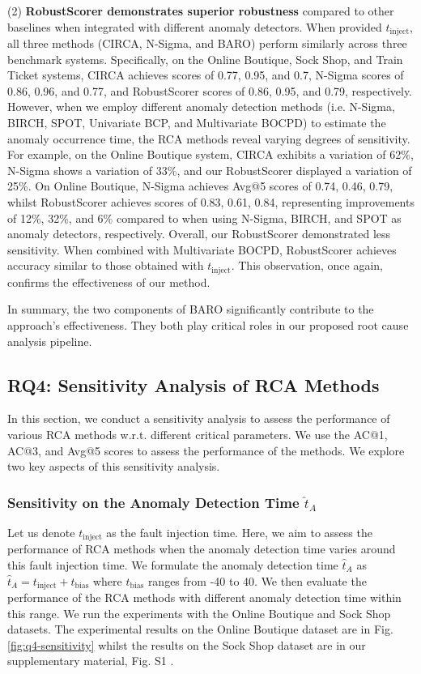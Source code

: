 (2) \textbf{RobustScorer demonstrates superior robustness} compared to other baselines when integrated with different anomaly detectors. When provided $t_{\text{inject}}$, all three methods (CIRCA, N-Sigma, and BARO) perform similarly across three benchmark systems. Specifically, on the Online Boutique, Sock Shop, and Train Ticket systems, CIRCA achieves scores of 0.77, 0.95, and 0.7, N-Sigma scores of 0.86, 0.96, and 0.77, and RobustScorer scores of 0.86, 0.95, and 0.79, respectively. However, when we employ different anomaly detection methods (i.e. N-Sigma, BIRCH, SPOT, Univariate BCP, and Multivariate BOCPD) to estimate the anomaly occurrence time, the RCA methods reveal varying degrees of sensitivity. For example, on the Online Boutique system, CIRCA exhibits a variation of 62\%, N-Sigma shows a variation of 33\%, and our RobustScorer displayed a variation of 25\%. 
On Online Boutique, N-Sigma achieves Avg@5 scores of 0.74, 0.46, 0.79, whilst RobustScorer achieves scores of 0.83, 0.61, 0.84, representing improvements of 12\%, 32\%, and 6\%  compared to when using N-Sigma, BIRCH, and SPOT as anomaly detectors, respectively.
Overall, our RobustScorer demonstrated less sensitivity. When combined with Multivariate BOCPD, RobustScorer achieves accuracy similar to those obtained with $t_{\text{inject}}$. This observation, once again, confirms the effectiveness of our method.
 
In summary, the two components of BARO significantly contribute to the approach's effectiveness. They both play critical roles in our proposed root cause analysis pipeline.


\subsection{RQ4: Sensitivity Analysis of RCA Methods} \label{exp:q4-sensitivity}

In this section, we conduct a sensitivity analysis to assess the performance of various RCA methods w.r.t. different critical parameters. We use the AC@1, AC@3, and Avg@5 scores to assess the performance of the methods. We explore two key aspects of this sensitivity analysis.

\subsubsection{Sensitivity on the Anomaly Detection Time $\hat{t}_A$}
Let us denote $t_{\text{inject}}$ as the fault injection time. Here, we aim to assess the performance of RCA methods when the anomaly detection time varies around this fault injection time. We formulate the anomaly detection time $\hat{t}_{A}$ as $\hat{t}_{A} = t_{\text{inject}} + t_{\text{bias}}$ where $t_{\text{bias}}$ ranges from -40 to 40. We then evaluate the performance of the RCA methods with different anomaly detection time within this range. We run the experiments with the Online Boutique and Sock Shop datasets. The experimental results on the Online Boutique dataset are in Fig. \ref{fig:q4-sensitivity} whilst the results on the Sock Shop dataset are in our supplementary material, Fig. S1 \cite{barogithubzenodo, barogithub}.


